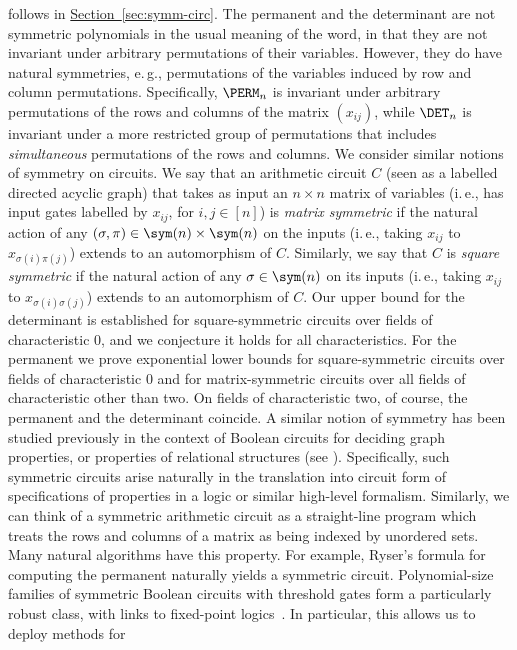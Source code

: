 \documentclass[11pt]{article}
\newcommand{\expref}[2]{\texorpdfstring{\hyperref[#2]{#1~\ref{#2}}}{#1~\ref{#2}}}
\newcommand{\ie}{i.\,e.}
\newcommand{\eg}{e.\,g.}
\begin{document}
follows in \expref{Section}{sec:symm-circ}.  The permanent and the determinant are
not symmetric polynomials in the usual meaning of the word, in that they are not
invariant under arbitrary permutations of their variables.  However, they do have
natural symmetries, \eg, permutations of the variables induced by row and column
permutations.  Specifically, $\PERM_n$ %
%
%
is invariant under arbitrary permutations
of the rows and columns of the matrix $(x_{ij})$, while $\DET_n$ is invariant
under a more restricted group of permutations that includes \emph{simultaneous}
permutations of the rows and columns.  We consider
similar notions of symmetry on circuits.  We say that an arithmetic circuit $C$
(seen as a labelled directed acyclic graph) that takes as input an $n \times n$
matrix of variables (\ie, has input gates labelled by $x_{ij}$, for $i, j \in
[n]$) is \emph{matrix symmetric} if the natural action of any $(\sigma,\pi) \in
\sym(n) \times\sym(n)$ on the inputs (\ie, taking $x_{ij}$ to
$x_{\sigma(i)\pi(j)}$) extends to an automorphism of $C$. Similarly, we say
that  %
$C$ is \emph{square symmetric} if the natural action of any $\sigma \in \sym(n)$ on
its inputs (\ie, taking $x_{ij}$ to $x_{\sigma(i)\sigma(j)}$) extends to an
automorphism of $C$.
Our upper bound for the determinant is established for
%
square-symmetric  %
%
circuits over fields of characteristic $0$, and we conjecture it holds for all characteristics. For the permanent we prove exponential lower bounds for square-symmetric circuits over fields of characteristic $0$ and for matrix-symmetric circuits over all fields of characteristic other than two.  On fields of characteristic two, of course, the permanent and the determinant coincide.
A similar notion of symmetry has been studied previously in the context of
Boolean circuits for deciding graph properties, or properties of relational
structures (see \cite{DenenbergGS86,Otto96,AndersonD17}). Specifically, such
symmetric circuits arise naturally in the translation into circuit form of
specifications of properties in a logic or similar high-level formalism.
Similarly, we can think of a symmetric arithmetic circuit as a straight-line
program which treats the rows and columns of a matrix as being indexed by
unordered sets. Many natural algorithms have this property. For example, Ryser's
formula for computing the permanent naturally yields a symmetric circuit.
Polynomial-size families of symmetric Boolean circuits with threshold gates form
a particularly robust class, with links to fixed-point
logics~\cite{AndersonD17}. In particular, this allows us to deploy methods for
\end{document}
